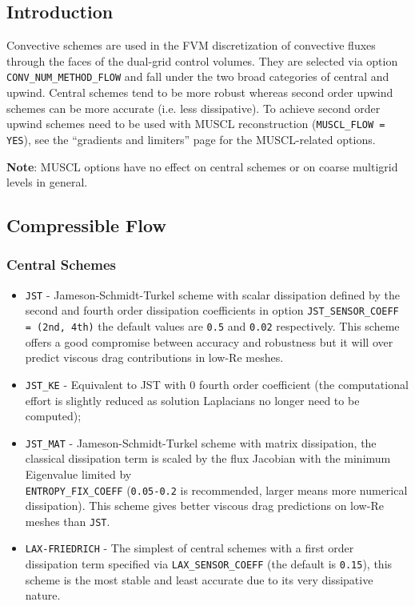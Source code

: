 \documentclass{article}
\begin{document}
\subsection{Introduction}
Convective schemes are used in the FVM discretization of convective fluxes through the faces of the dual-grid control volumes. They are selected via option \verb|CONV_NUM_METHOD_FLOW| and fall under the two broad categories of central and upwind. Central schemes tend to be more robust whereas second order upwind schemes can be more accurate (i.e. less dissipative). To achieve second order upwind schemes need to be used with MUSCL reconstruction (\verb|MUSCL_FLOW = YES|), see the “gradients and limiters” page for the MUSCL-related options.

\textbf{Note}: MUSCL options have no effect on central schemes or on coarse multigrid levels in general.


\subsection{Compressible Flow}

\subsubsection{Central Schemes}

\begin{itemize}
    \item \verb|JST| - Jameson-Schmidt-Turkel scheme with scalar dissipation defined by the second and fourth order dissipation coefficients in option \verb|JST_SENSOR_COEFF = (2nd, 4th)| the default values are \verb|0.5| and \verb|0.02| respectively. This scheme offers a good compromise between accuracy and robustness but it will over predict viscous drag contributions in low-Re meshes.
    \item \verb|JST_KE| - Equivalent to JST with 0 fourth order coefficient (the computational effort is slightly reduced as solution Laplacians no longer need to be computed);
    \item  \verb|JST_MAT| - Jameson-Schmidt-Turkel scheme with matrix dissipation, the classical dissipation term is scaled by the flux Jacobian with the minimum Eigenvalue limited by \\ \verb|ENTROPY_FIX_COEFF| (\verb|0.05-0.2| is recommended, larger means more numerical dissipation). This scheme gives better viscous drag predictions on low-Re meshes than \verb|JST|.
    \item \verb|LAX-FRIEDRICH| - The simplest of central schemes with a first order dissipation term specified via \verb|LAX_SENSOR_COEFF| (the default is \verb|0.15|), this scheme is the most stable and least accurate due to its very dissipative nature.
\end{itemize}
\end{document}
